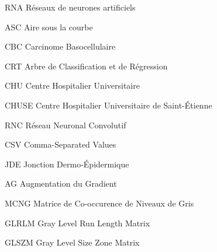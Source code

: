 
            {RNA}
            {Réseaux de neurones artificiels}
            
            {ASC}
            {Aire sous la courbe}
            
            {CBC}
            {Carcinome Basocellulaire}
            
            {CRT}
            {Arbre de Classification et de Régression}
            
            {CHU}
            {Centre Hospitalier Universitaire}
            
            {CHUSE}
            {Centre Hospitalier Universitaire de Saint-Étienne}
            
            {RNC}
            {Réseau Neuronal Convolutif}
            
            {CSV}
            {Comma-Separated Values}
            
            {JDE}
            {Jonction Dermo-Épidermique}
            
            
            {AG}
            {Augmentation du Gradient}   
            
            {MCNG}
            {Matrice de Co-occurence de Niveaux de Gris}
            
            {GLRLM}
            {Gray Level Run Length Matrix}
            
            {GLSZM}
            {Gray Level Size Zone Matrix}


